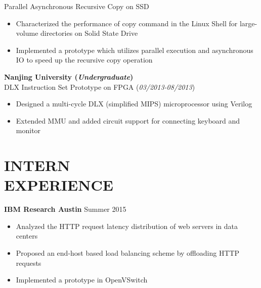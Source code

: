\documentclass[margin, 9pt]{res} %
\begin{document}
\begin{resume}
\medskip
Parallel Asynchronous Recursive Copy on SSD\\
\vspace*{-10pt}
\begin{itemize}[leftmargin=*] \itemsep -3pt
\vspace*{-5pt}
	\item Characterized the performance of copy command in the Linux Shell for large-volume directories on Solid State Drive
	\item Implemented a prototype which utilizes parallel execution and asynchronous IO to speed up the recursive copy operation
\end{itemize}

\bigskip
{\large\textbf{Nanjing University (\textit{Undergraduate})}}\\

\vspace*{-7pt}
DLX Instruction Set Prototype on FPGA \hfill(\textit{03/2013-08/2013})\\
\vspace*{-10pt}
\begin{itemize}[leftmargin=*] \itemsep -3pt
\vspace*{-5pt}
	\item Designed a multi-cycle DLX (simplified MIPS) microprocessor using Verilog
	\item Extended MMU and added circuit support for connecting keyboard and monitor
\end{itemize}


\section{INTERN\\ EXPERIENCE} 

{\textbf{IBM Research Austin}} \hfill{Summer 2015}\\
\vspace*{-10pt}
\begin{itemize}[leftmargin=*] \itemsep -3pt
\vspace*{-5pt}
	\item Analyzed the HTTP request latency distribution of web servers in data centers
	\item Proposed an end-host based load balancing scheme by offloading HTTP requests
	\item Implemented a prototype in OpenVSwitch
\end{itemize}


\end{resume}
\end{document}
